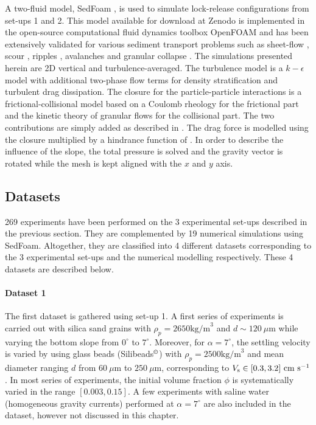 \documentclass[12pt]{article}
\begin{document}
A two-fluid model, SedFoam \citep{chauchat2017}, is used to simulate lock-release configurations from set-ups 1 and 2. This model available for download at Zenodo \citep{bonamy2023} is implemented in the open-source computational fluid dynamics toolbox OpenFOAM and has been extensively validated for various sediment transport problems such as sheet-flow \citep{cheng2016,chauchat2022,mathieu2021,mathieu2022}, scour \citep{nagel2020,tsai2022}, ripples \citep{salimi2021a,salimi2021b}, avalanches \citep{montella2021} and granular collapse \citep{montella2023}. The simulations presented herein are 2D vertical and turbulence-averaged. The turbulence model is a $k-\epsilon$ model with additional two-phase flow terms for density stratification and turbulent drag dissipation. The closure for the particle-particle interactions is a frictional-collisional model based on a Coulomb rheology for the frictional part and the kinetic theory of granular flows for the collisional part. The two contributions are simply added as described in \cite{chauchat2017}. The drag force is modelled using the \cite{schiller1933} closure multiplied by a hindrance function of \cite{richardson1954}. In order to describe the influence of the slope, the total pressure is solved and the gravity vector is rotated while the mesh is kept aligned with the $x$ and $y$ axis.

\subsection{Datasets}
\label{sec:datasets}

269 experiments have been performed on the 3 experimental set-ups described in the previous section. They are complemented by 19 numerical simulations using SedFoam. Altogether, they are classified into 4 different datasets corresponding to the 3 experimental set-ups and the numerical modelling respectively. These 4 datasets are described below.

\paragraph{Dataset 1}

The first dataset is gathered using set-up 1. A first series of experiments is carried out with silica sand grains with $\rho_p=2650\textrm{kg/m}^{3}$ and $d \sim 120~\mu\textrm{m}$ while varying the bottom slope from $0^\circ$ to $7^\circ$. Moreover, for $\alpha = 7^\circ$, the settling velocity is varied by using glass beads (Silibeads$^\copyright$) with $\rho_p=2500\textrm{kg/m}^{3}$ and mean diameter ranging $d$ from $60~\mu\textrm{m}$ to $250~\mu\textrm{m}$, corresponding to $V_{\text s} \in [0.3, 3.2]~\textrm{cm}~\textrm{s}^{-1}$. In most series of experiments, the initial volume fraction $\phi$  is systematically varied in the range $[0.003, 0.15]$.
%
A few experiments with saline water (homogeneous gravity currents) performed at $\alpha=7^\circ$ are also included in the dataset, however not discussed in this chapter.
\end{document}
